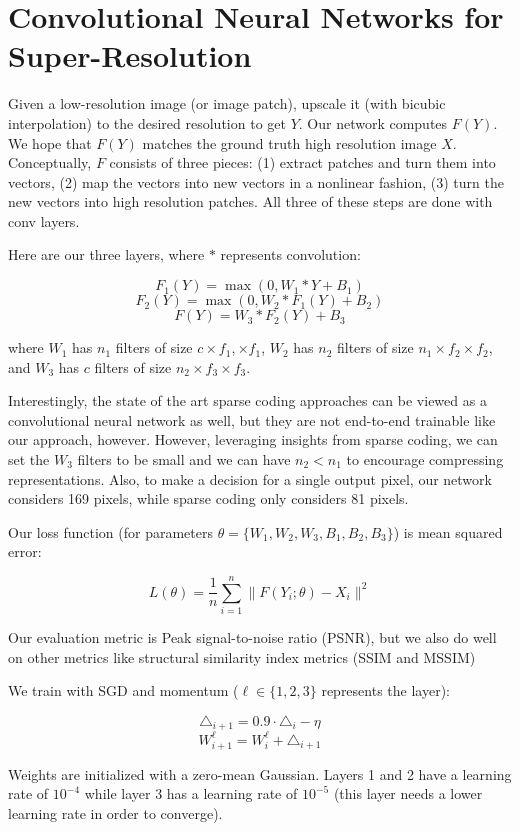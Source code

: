 \documentclass[a4paper]{article}
\begin{document}
\section{Convolutional Neural Networks for Super-Resolution}
Given a low-resolution image (or image patch), upscale it (with bicubic
interpolation) to the desired resolution to get $Y$. Our network computes
$F(Y)$. We hope that $F(Y)$ matches the ground truth high resolution image
$X$. Conceptually, $F$ consists of three pieces: (1) extract patches and turn
them into vectors, (2) map the vectors into new vectors in a nonlinear fashion,
(3) turn the new vectors into high resolution patches. All three of these
steps are done with conv layers.

Here are our three layers, where $*$ represents convolution:

$$
F_1(Y) = \max(0, W_1 * Y + B_1)
$$
$$
F_2(Y) = \max(0, W_2 * F_1(Y) + B_2)
$$
$$
F(Y) = W_3 * F_2(Y) + B_3
$$

where $W_1$ has $n_1$ filters of size $c \times f_1, \times f_1$, $W_2$ has
$n_2$ filters of size $n_1 \times f_2 \times f_2$, and $W_3$ has $c$ filters
of size $n_2 \times f_3 \times f_3$.

Interestingly, the state of the art sparse coding approaches can be viewed
as a convolutional neural network as well, but they are not end-to-end trainable
like our approach, however. However, leveraging insights from sparse coding,
we can set the $W_3$ filters to be small and we can have $n_2 < n_1$ to
encourage compressing representations. Also, to make a decision for a single
output pixel, our network considers 169 pixels, while sparse coding only
considers 81 pixels.

Our loss function (for parameters $\theta = \{W_1, W_2, W_3, B_1, B_2, B_3\}$)
is mean squared error:

$$
L(\theta) = \frac{1}{n}\sum_{i=1}^{n}{\lVert F(Y_i; \theta) - X_i \rVert^2}
$$

Our evaluation metric is Peak signal-to-noise ratio (PSNR), but we also do well
on other metrics like structural similarity index metrics (SSIM and MSSIM)

We train with SGD and momentum ($\ell \in \{1, 2, 3\}$ represents the layer):

$$
\triangle_{i+1} = 0.9 \cdot \triangle_i - \eta
$$
$$
W_{i+1}^{\ell} = W_i^{\ell} + \triangle_{i+1}
$$

Weights are initialized with a zero-mean Gaussian. Layers 1 and 2 have a
learning rate of $10^{-4}$ while layer 3 has a learning rate of $10^{-5}$ (this
layer needs a lower learning rate in order to converge).
\end{document}
